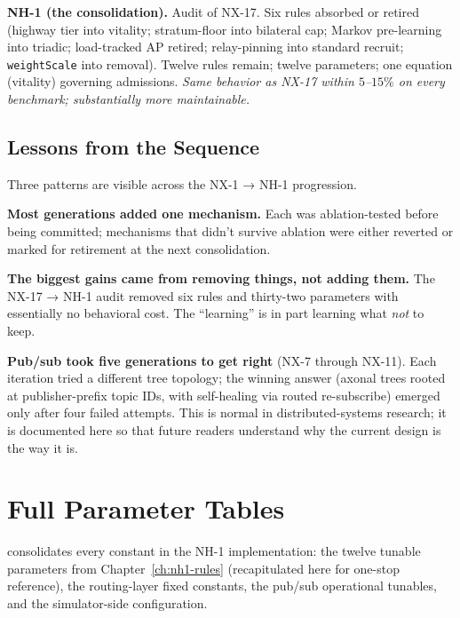 \documentclass[twoside,nobib]{tufte-book}
\begin{document}
\textbf{NH-1 (the consolidation).} Audit of NX-17. Six rules
absorbed or retired (highway tier into vitality;
stratum-floor into bilateral cap; Markov pre-learning into
triadic; load-tracked AP retired; relay-pinning into standard
recruit; \texttt{weightScale} into removal). Twelve rules
remain; twelve parameters; one equation (vitality) governing
admissions. \emph{Same behavior as NX-17 within $5$--$15\%$
on every benchmark; substantially more maintainable.}

\section{Lessons from the Sequence}

Three patterns are visible across the NX-1 → NH-1 progression.

\textbf{Most generations added one mechanism.} Each was
ablation-tested before being committed; mechanisms that
didn't survive ablation were either reverted or marked for
retirement at the next consolidation.

\textbf{The biggest gains came from removing things, not adding
them.} The NX-17 → NH-1 audit removed six rules and
thirty-two parameters with essentially no behavioral cost. The
``learning'' is in part learning what \emph{not} to keep.

\textbf{Pub/sub took five generations to get right} (NX-7
through NX-11). Each iteration tried a different tree topology;
the winning answer (axonal trees rooted at publisher-prefix
topic IDs, with self-healing via routed re-subscribe) emerged
only after four failed attempts. This is normal in
distributed-systems research; it is documented here so that
future readers understand why the current design is the way
it is.


\chapter{Full Parameter Tables}
\label{app:params}

 consolidates every constant in the
NH-1 implementation: the twelve tunable parameters from
Chapter~\ref{ch:nh1-rules} (recapitulated here for one-stop
reference), the routing-layer fixed constants, the pub/sub
operational tunables, and the simulator-side configuration.
\end{document}
